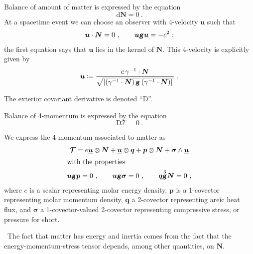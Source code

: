 \documentclass[\ifafour a4paper,12pt,\else a5paper,10pt,\fi%
onecolumn,oneside,article,%
british%
]{memoir}
\theoremstyle{remark}
\theoremstyle{innote}
\newcommand*{\mathte}[1]{\textbf{\textit{\textsf{#1}}}}
\newcommand*{\wrench}{{\fontencoding{U}\fontfamily{fontawesomethree}\selectfont\symbol{114}}}
\newcommand{\mynotew}[1]{{\footnotesize\color{notecolour}\wrench\ #1}}
\newcommand*{\di}{\mathrm{d}}%
\newcommand*{\Di}{\mathrm{D}}%
\newcommand*{\defd}{\coloneqq}
\DeclarePairedDelimiter\abs{\lvert}{\rvert}
\renewcommand*{\|}[1][]{\nonscript\:#1\vert\nonscript\:\mathopen{}}
\newcommand*{\cf}{{cf.}}
\newcommand*{\yg}{\mathte{g}}
\newcommand*{\yu}{\bm{u}}
\newcommand*{\yuu}{\underline{\yu}}
\newcommand*{\yN}{\bm{N}}
\newcommand*{\ygv}{\gamma^{-1}}
\newcommand*{\yT}{\bm{\mathcal{T}}}
\newcommand*{\yq}{\bm{q}}
\newcommand*{\yp}{\bm{p}}
\newcommand*{\ys}{\bm{\sigma}}
\begin{document}
Balance of amount of matter is expressed by the equation
\begin{equation}
  \label{eq:balance_matter}
  \di\yN = 0 \ .
\end{equation}
At a spacetime event we can choose an observer with 4-velocity $\yu$ such that\autocites[\cf][p.~920]{eckart1940c}
\begin{equation}
  \label{eq:4velocity_matter}
  \yu \cdot \yN = 0 \ ,
  \qquad
  \yu\yg\yu = -c^{2} \ ;
\end{equation}
the first equation says that $\yu$ lies in the kernel of $\yN$. This 4-velocity is explicitly given by
\begin{equation}
  \label{eq:matter_to_4velocity}
  \yu \defd \frac{c\,\ygv\cdot\yN}{
    \sqrt{\abs{(\ygv\cdot\yN)\,\yg\,(\ygv\cdot\yN)}\,}
  }
  \ .
\end{equation}


The exterior covariant derivative is denoted \enquote{$\Di$}.

Balance of 4-momentum is expressed by the equation
\begin{equation}
  \label{eq:balance_4mom}
  \Di\yT = 0 \ .
\end{equation}

We express the 4-momentum associated to matter as
\begin{gather}
  \label{eq:4momentum_matter_decomp}
  \yT = e \yuu \otimes \yN +
  \yuu \otimes \yq +
  \yp \otimes \yN +
  \ys \land \yuu
  \\
  \shortintertext{with the properties}
  \yu \yg \yp = 0 \ ,
  \qquad
  \yu \yg \ys = 0 \ ,
  \qquad
  \yq \overset{3}{\yg} \yN = 0 \ ,
\end{gather}
where $e$ is a scalar representing molar energy density, $\yp$ is a 1-covector representing molar momentum density, $\yq$ a 2-covector representing areic heat flux, and $\ys$ a 1-covector-valued 2-covector representing compressive stress, or pressure for short.

\mynotew{The fact that matter has energy and inertia comes from the fact that the energy-momentum-stress tensor depends, among other quantities, on $\yN$.}



\end{document}
